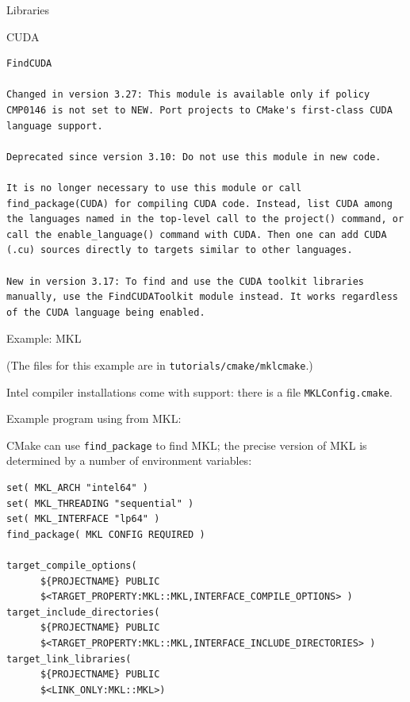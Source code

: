

 {Libraries}

 {CUDA}

\begin{verbatim}
FindCUDA

Changed in version 3.27: This module is available only if policy CMP0146 is not set to NEW. Port projects to CMake's first-class CUDA language support.

Deprecated since version 3.10: Do not use this module in new code.

It is no longer necessary to use this module or call find_package(CUDA) for compiling CUDA code. Instead, list CUDA among the languages named in the top-level call to the project() command, or call the enable_language() command with CUDA. Then one can add CUDA (.cu) sources directly to targets similar to other languages.

New in version 3.17: To find and use the CUDA toolkit libraries manually, use the FindCUDAToolkit module instead. It works regardless of the CUDA language being enabled.
\end{verbatim}

 {Example: MKL}

(The files for this example are in \lstinline[language=shell]{tutorials/cmake/mklcmake}.)

Intel compiler installations come with  support:
there is a file \lstinline[language=shell]{MKLConfig.cmake}.

Example program using  from MKL:


CMake can use \lstinline{find_package} to find MKL;
the precise version of MKL is determined
by a number of environment variables:
%
\begin{lstlisting}
set( MKL_ARCH "intel64" )
set( MKL_THREADING "sequential" )
set( MKL_INTERFACE "lp64" )
find_package( MKL CONFIG REQUIRED )

target_compile_options(
	  ${PROJECTNAME} PUBLIC
	  $<TARGET_PROPERTY:MKL::MKL,INTERFACE_COMPILE_OPTIONS> )
target_include_directories(
	  ${PROJECTNAME} PUBLIC
	  $<TARGET_PROPERTY:MKL::MKL,INTERFACE_INCLUDE_DIRECTORIES> )
target_link_libraries(
	  ${PROJECTNAME} PUBLIC 
	  $<LINK_ONLY:MKL::MKL>)
\end{lstlisting}


